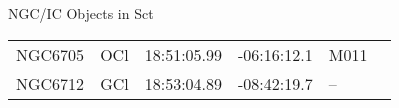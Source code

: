 \begin{block}{NGC/IC Objects in Sct}
  \centering
  \begin{tabularx}{\textwidth}{llrrll} 
    NGC6705 & OCl & 18:51:05.99 & -06:16:12.1  & M011 \\ 
    NGC6712 & GCl & 18:53:04.89 & -08:42:19.7  & -- \\ 
  \end{tabularx}
\end{block}